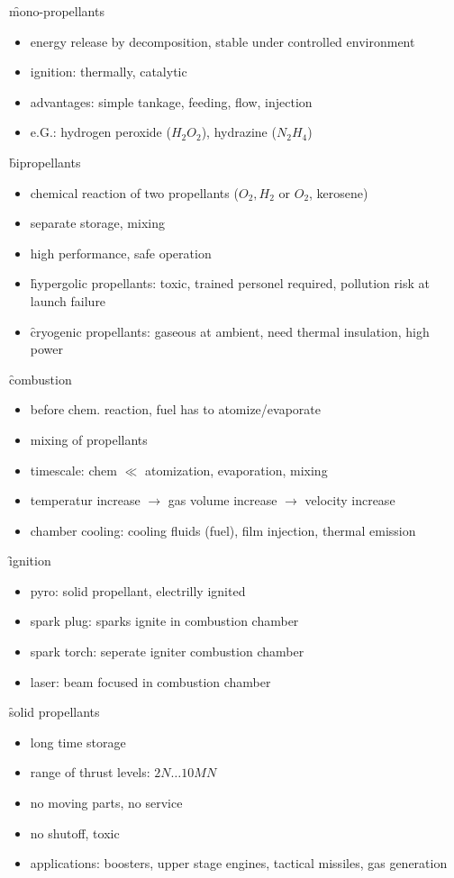 \f{mono-propellants}
\begin{itemize}
 \item energy release by decomposition, stable under controlled environment
 \item ignition: thermally, catalytic
 \item advantages: simple tankage, feeding, flow, injection
 \item e.G.: hydrogen peroxide ($H_2O_2$), hydrazine ($N_2H_4$)
\end{itemize}

\f{bipropellants}
\begin{itemize}
 \item chemical reaction of two propellants ($O_2, H_2$ or $O_2$, kerosene)
 \item separate storage, mixing
 \item high performance, safe operation
 \item \f{hypergolic propellants:} toxic, trained personel required, pollution risk at launch failure
 \item \f{cryogenic propellants:} gaseous at ambient, need thermal insulation, high power
\end{itemize}

\f{combustion}
\begin{itemize}
 \item before chem. reaction, fuel has to atomize/evaporate
 \item mixing of propellants
 \item timescale: chem $\ll$ atomization, evaporation, mixing
 \item temperatur increase $\rightarrow$ gas volume increase $\rightarrow$ velocity increase
 \item chamber cooling: cooling fluids (fuel), film injection, thermal emission
\end{itemize}

\f{ignition}
\begin{itemize}
 \item pyro: solid propellant, electrilly ignited
 \item spark plug: sparks ignite in combustion chamber
 \item spark torch: seperate igniter combustion chamber
 \item laser: beam focused in combustion chamber
\end{itemize}

\f{solid propellants}
\begin{itemize}
 \item long time storage
 \item range of thrust levels: $2N\dots 10MN$
 \item no moving parts, no service
 \item no shutoff, toxic
 \item applications: boosters, upper stage engines, tactical missiles, gas generation
\end{itemize}

